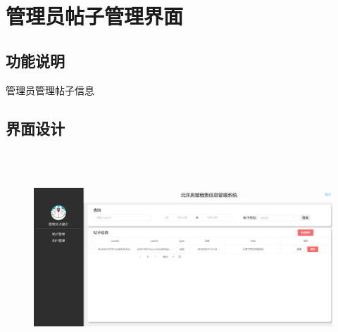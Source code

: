 \section{管理员帖子管理界面}

\subsection{功能说明}
管理员管理帖子信息
\subsection{界面设计}

\begin{figure}[h]
    \centering
    \includegraphics[width=14.0cm,height=8.0cm]{design/image/tiezigl.png} 
    \end{figure}
\newpage


